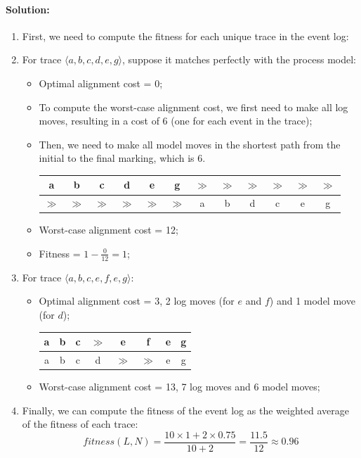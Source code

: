 \paragraph{Solution:}
\begin{enumerate}
    \item First, we need to compute the fitness for each unique trace in the event log:
    \item For trace $\langle a,b,c,d,e,g \rangle$, suppose it matches perfectly with the process model:
    \begin{itemize}
        \item Optimal alignment cost = 0;
        \item To compute the worst-case alignment cost, we first need to make all log moves, resulting in a cost of 6 (one for each event in the trace);
        \item Then, we need to make all model moves in the shortest path from the initial to the final marking, which is 6.
    \begin{table}[H]
        \centering
        \begin{tabular}{|c|c|c|c|c|c|c|c|c|c|c|c|}
            \hline
            a & b & c & d & e & g & $\gg$ & $\gg$ & $\gg$ & $\gg$ & $\gg$ & $\gg$ \\
            \hline
            $\gg$ & $\gg$ & $\gg$ & $\gg$ & $\gg$ & $\gg$ & a & b & d & c & e & g \\ 
            \hline
        \end{tabular}
    \end{table}
        \item Worst-case alignment cost = 12;
        \item Fitness = $1 - \frac{0}{12} = 1$;
    \end{itemize}
    \item For trace $\langle a,b,c,e,f,e,g \rangle$:
    \begin{itemize}
        \item Optimal alignment cost = 3, 2 log moves (for $e$ and $f$) and 1 model move (for $d$);
        \begin{table}[H]
            \centering
            \begin{tabular}{|c|c|c|c|c|c|c|c|}
                \hline
                a & b & c & $\gg$ & e & f & e & g \\
                \hline
                a & b & c & d & $\gg$ & $\gg$ & e & g \\
                \hline
            \end{tabular}
        \end{table}
        \item Worst-case alignment cost = 13, 7 log moves and 6 model moves;
    \end{itemize}
    \item Finally, we can compute the fitness of the event log as the weighted average of the fitness of each trace:
    \[fitness(L, N) = \frac{10 \times 1 + 2 \times 0.75}{10 + 2} = \frac{11.5}{12} \approx 0.96\]
\end{enumerate}

